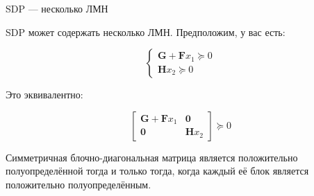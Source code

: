 \documentclass{beamer}
\begin{document}
\begin{frame}{SDP — несколько ЛМН}
	\begin{flushleft}
		
		SDP может содержать несколько ЛМН. Предположим, у вас есть:
		
		\begin{equation}
			\begin{cases}
				\mathbf{G} +  \mathbf{F} x_1 \succeq 0 \\
				\mathbf{H} x_2 \succeq 0
			\end{cases}
		\end{equation}
		
		Это эквивалентно:
		
		\begin{equation}
			\begin{bmatrix} 
				\mathbf{G} +  \mathbf{F} x_1 & \mathbf{0} \\
				\mathbf{0} & \mathbf{H} x_2 
			\end{bmatrix} 
			\succeq 0
		\end{equation}
		
		Симметричная блочно-диагональная матрица является положительно полуопределённой тогда и только тогда, когда каждый её блок является положительно полуопределённым.
		
	\end{flushleft}
\end{frame}
\end{document}
